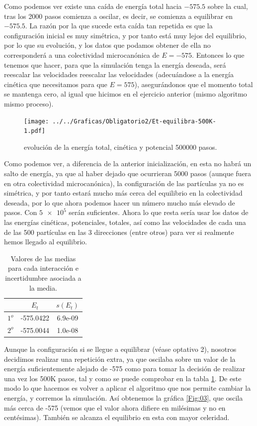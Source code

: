 \documentclass[11pt]{article} %
\begin{document}
Como podemos ver existe una caída de energía total hacia $-575.5$ sobre la cual, tras los 2000 pasos comienza a oscilar, es decir, se comienza a equilibrar en $-575.5$. La razón por la que sucede esta caída tan repetida es que la configuración inicial es muy simétrica, y por tanto está muy lejos del equilibrio, por lo que su evolución, y los datos que podamos obtener de ella no corresponderá a una colectividad microcanónica de $E=-575$. Entonces lo que tenemos que hacer, para que la simulación tenga la energía deseada, será reescalar las velocidades reescalar las velocidades (adecuándose a la energía cinética que necesitamos para que $E=575$), asegurándonos que el momento total se mantenga cero, al igual que hicimos en el ejercicio anterior (mismo algoritmo mismo proceso).


\begin{figure}[h!] \centering
	\texttt{[image: ../../Graficas/Obligatorio2/Et-equilibra-500K-1.pdf]}
	\caption{evolución de la energía total, cinética y potencial 500000 pasos.}
	\label{Fig:02}
\end{figure}	

Como podemos ver, a diferencia de la anterior inicialización, en esta no habrá un salto de energía, ya que al haber dejado que ocurrieran 5000 pasos (aunque fuera en otra colectividad microcanónica), la configuración de las partículas ya no es simétrica, y por tanto estará mucho más cerca del equilibrio en la colectividad deseada, por lo que ahora podemos hacer un número mucho más elevado de pasos. Con $\num{5e5}$ serán suficientes. Ahora lo que resta sería usar los datos de las energías cinéticas, potenciales, totales, así como las velocidades de cada una de las 500 partículas en las 3 direcciones (entre otros) para ver si realmente hemos llegado al equilibrio.  

\begin{table}[h!] \centering
	\begin{tabular}{c|c|c}
		& $E_t$ & $s(E_t)$ \\ \hline
		$1^o$ &-575.0422 & 6.9e-09  \\ \hline
		$2^o$ & -575.0044 & 1.0e-08 
	\end{tabular}
	\caption{Valores de las medias para cada interacción e incertidumbre asociada a la media.}
	\label{Tab:01}
\end{table}

Aunque la configuración si se llegue a equilibrar (véase optativo 2), nosotros decidimos realizar una repetición extra, ya que oscilaba sobre un valor de la energía suficientemente alejado de -575 como para tomar la decisión de realizar una vez los 500K pasos, tal y como se puede comprobar en la tabla \ref{Tab:01}. De este modo lo que hacemos es volver a aplicar el algoritmo que nos permite cambiar la energía, y corremos la simulación. Así obtenemos la gráfica \ref{Fig:03}, que oscila más cerca de -575 (vemos que el valor ahora difiere en milésimas y no en centésimas). También se alcanza el equilibrio en esta con mayor celeridad.
\end{document}
